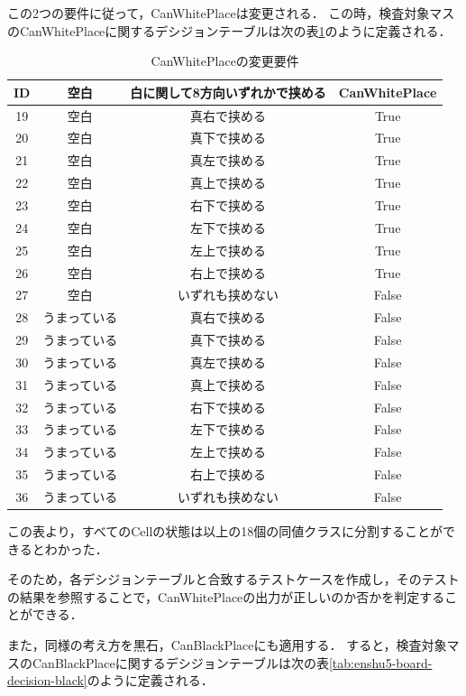 \documentclass[platex,dvipdfmx,12pt]{jsarticle}
\begin{document}
この2つの要件に従って，CanWhitePlaceは変更される．
この時，検査対象マスのCanWhitePlaceに関するデシジョンテーブルは次の表\ref{tab:enshu5-board-decision-white}のように定義される．

\begin{table}[H]
  \centering
  \caption{CanWhitePlaceの変更要件}
  \label{tab:enshu5-board-decision-white}
  \begin{tabular}{cccc}
    ID & 空白 & 白に関して8方向いずれかで挟める & CanWhitePlace \\
    \hline
    19 & 空白 & 真右で挟める & True \\
    20 & 空白 & 真下で挟める & True \\
    21 & 空白 & 真左で挟める & True \\
    22 & 空白 & 真上で挟める & True \\
    23 & 空白 & 右下で挟める & True \\
    24 & 空白 & 左下で挟める & True \\
    25 & 空白 & 左上で挟める & True \\
    26 & 空白 & 右上で挟める & True \\
    27 & 空白 & いずれも挟めない & False \\
    28 & うまっている & 真右で挟める & False \\
    29 & うまっている & 真下で挟める & False \\
    30 & うまっている & 真左で挟める & False \\
    31 & うまっている & 真上で挟める & False \\
    32 & うまっている & 右下で挟める & False \\
    33 & うまっている & 左下で挟める & False \\
    34 & うまっている & 左上で挟める & False \\
    35 & うまっている & 右上で挟める & False \\
    36 & うまっている & いずれも挟めない & False \\
  \end{tabular}
\end{table}

この表より，すべてのCellの状態は以上の18個の同値クラスに分割することができるとわかった．

そのため，各デシジョンテーブルと合致するテストケースを作成し，そのテストの結果を参照することで，CanWhitePlaceの出力が正しいのか否かを判定することができる．

また，同様の考え方を黒石，CanBlackPlaceにも適用する．
すると，検査対象マスのCanBlackPlaceに関するデシジョンテーブルは次の表\ref{tab:enshu5-board-decision-black}のように定義される．
\end{document}
